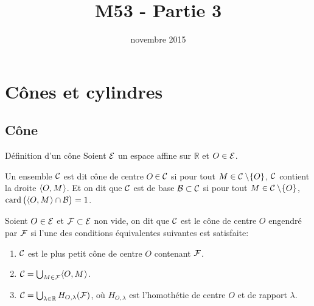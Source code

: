 \documentclass[11pt]{m53beamer}
\title{M53 - Partie 3}
\date{novembre 2015}
\begin{document}
\begin{frame}
  \titlepage
\end{frame}

\section{Cônes et cylindres}

\subsection{Cône}

\begin{frame}{Définition d'un cône}
  Soient $\mathcal{E}$ un espace affine sur $\mathbb{R}$ et $O \in \mathcal{E}$.\pause
  \begin{definition}
    Un ensemble $\mathcal{C}$ est dit \alert{cône de centre $O$}\,$\in \mathcal{C}$ si pour tout $M \in \mathcal{C}\setminus\!\{O\}$, $\mathcal{C}$ contient la droite $\langle{O,M}\kern.07em\rangle$.\pause{}
    Et on dit que $\mathcal{C}$ est de \alert{base} $\mathcal{B} \subset \mathcal{C}$ si pour tout $M \in \mathcal{C}\setminus\!\{O\}$, $\operatorname{card}\big(\langle{O,M}\kern.07em\rangle \cap \mathcal{B}\big)=1$.
  \end{definition}\pause
  \begin{defprop}
    Soient $O \in \mathcal{E}$ et $\mathcal{F} \subset \mathcal{E}$ non vide, on dit que $\mathcal{C}$ est \alert{le cône de centre $O$ engendré par $\mathcal{F}$} si l'une des conditions équivalentes suivantes est satisfaite:
    \begin{enumerate}[<+(1)->]
         \item $\mathcal{C}$ est le plus petit cône de centre $O$ contenant $\mathcal{F}$.
         \item $\mathcal{C}=\bigcup_{M \in \mathcal{F}} \langle{O,M}\kern.07em\rangle$.
         \item $\mathcal{C}=\bigcup_{\lambda \in \mathbb{R}} H_{O,\lambda}(\mathcal{F})$, où $H_{O,\lambda}$ est l'homothétie de centre $O$ et de rapport $\lambda$.
       \end{enumerate}
  \end{defprop}
\end{frame}
\end{document}
